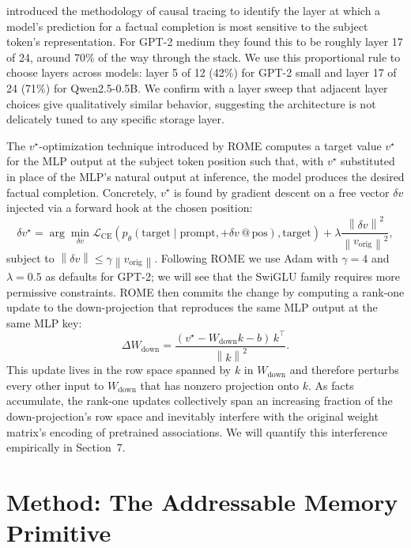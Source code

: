 \documentclass[11pt,a4paper]{article}
\newcommand{\norm}[1]{\left\|#1\right\|}
\begin{document}
\citet{meng2022rome} introduced the methodology of causal tracing to
identify the layer at which a model's prediction for a factual
completion is most sensitive to the subject token's representation.
For GPT-2 medium they found this to be roughly layer 17 of 24, around
70\% of the way through the stack. We use this proportional rule to
choose layers across models: layer 5 of 12 (42\%) for GPT-2 small and
layer 17 of 24 (71\%) for Qwen2.5-0.5B. We confirm with a layer sweep
that adjacent layer choices give qualitatively similar behavior,
suggesting the architecture is not delicately tuned to any specific
storage layer.

The $v^\star$-optimization technique introduced by ROME computes a
target value $v^\star$ for the MLP output at the subject token position
such that, with $v^\star$ substituted in place of the MLP's natural
output at inference, the model produces the desired factual completion.
Concretely, $v^\star$ is found by gradient descent on a free vector
$\delta v$ injected via a forward hook at the chosen position:
\begin{equation}
\delta v^\star = \arg\min_{\delta v} \mathcal{L}_\text{CE}\left(p_\theta(\text{target} \mid \text{prompt}, +\delta v\,@\,\text{pos}), \text{target}\right) + \lambda \frac{\norm{\delta v}^2}{\norm{v_\text{orig}}^2},
\end{equation}
subject to $\norm{\delta v} \le \gamma \norm{v_\text{orig}}$. Following
ROME we use Adam with $\gamma = 4$ and $\lambda = 0.5$ as defaults for
GPT-2; we will see that the SwiGLU family requires more permissive
constraints. ROME then commits the change by computing a rank-one
update to the down-projection that reproduces the same MLP output
at the same MLP key:
\begin{equation}
\Delta W_\text{down} = \frac{(v^\star - W_\text{down} k - b)\, k^\top}{\norm{k}^2}.
\end{equation}
This update lives in the row space spanned by $k$ in $W_\text{down}$ and
therefore perturbs every other input to $W_\text{down}$ that has nonzero
projection onto $k$. As facts accumulate, the rank-one updates
collectively span an increasing fraction of the down-projection's row
space and inevitably interfere with the original weight matrix's encoding
of pretrained associations. We will quantify this interference empirically
in Section~7.

\section{Method: The Addressable Memory Primitive}
\end{document}
